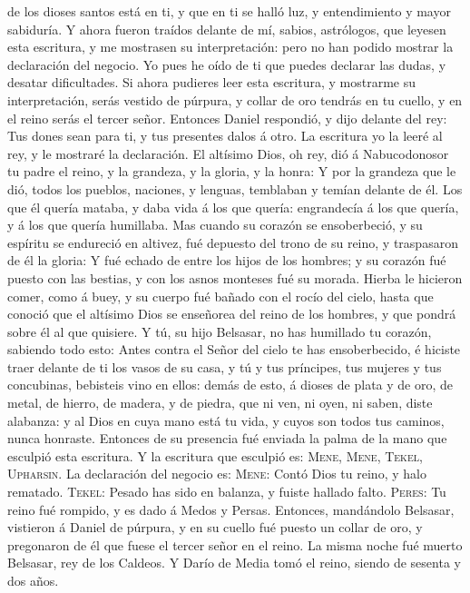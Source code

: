 de los dioses santos está en ti, y que en ti se halló luz, y
entendimiento y mayor sabiduría.  Y ahora fueron traídos
delante de mí, sabios, astrólogos, que leyesen esta escritura, y me
mostrasen su interpretación: pero no han podido mostrar la declaración
del negocio.  Yo pues he oído de ti que puedes declarar
las dudas, y desatar dificultades. Si ahora pudieres leer esta
escritura, y mostrarme su interpretación, serás vestido de púrpura, y
collar de oro tendrás en tu cuello, y en el reino serás el tercer señor.
 Entonces Daniel respondió, y dijo delante del rey: Tus
dones sean para ti, y tus presentes dalos á otro. La escritura yo la
leeré al rey, y le mostraré la declaración.  El altísimo
Dios, oh rey, dió á Nabucodonosor tu padre el reino, y la grandeza, y la
gloria, y la honra:  Y por la grandeza que le dió, todos
los pueblos, naciones, y lenguas, temblaban y temían delante de él. Los
que él quería mataba, y daba vida á los que quería: engrandecía á los
que quería, y á los que quería humillaba.  Mas cuando su
corazón se ensoberbeció, y su espíritu se endureció en altivez, fué
depuesto del trono de su reino, y traspasaron de él la gloria:
 Y fué echado de entre los hijos de los hombres; y su
corazón fué puesto con las bestias, y con los asnos monteses fué su
morada. Hierba le hicieron comer, como á buey, y su cuerpo fué bañado
con el rocío del cielo, hasta que conoció que el altísimo Dios se
enseñorea del reino de los hombres, y que pondrá sobre él al que
quisiere.  Y tú, su hijo Belsasar, no has humillado tu
corazón, sabiendo todo esto:  Antes contra el Señor del
cielo te has ensoberbecido, é hiciste traer delante de ti los vasos de
su casa, y tú y tus príncipes, tus mujeres y tus concubinas, bebisteis
vino en ellos: demás de esto, á dioses de plata y de oro, de metal, de
hierro, de madera, y de piedra, que ni ven, ni oyen, ni saben, diste
alabanza: y al Dios en cuya mano está tu vida, y cuyos son todos tus
caminos, nunca honraste.  Entonces de su presencia fué
enviada la palma de la mano que esculpió esta escritura. 
Y la escritura que esculpió es: \textsc{Mene}, \textsc{Mene},
\textsc{Tekel}, \textsc{Upharsin}.  La declaración del
negocio es: \textsc{Mene}: Contó Dios tu reino, y halo rematado.
 \textsc{Tekel}: Pesado has sido en balanza, y fuiste
hallado falto.  \textsc{Peres}: Tu reino fué rompido, y
es dado á Medos y Persas.  Entonces, mandándolo Belsasar,
vistieron á Daniel de púrpura, y en su cuello fué puesto un collar de
oro, y pregonaron de él que fuese el tercer señor en el reino.
 La misma noche fué muerto Belsasar, rey de los Caldeos.
 Y Darío de Media tomó el reino, siendo de sesenta y dos
años.

